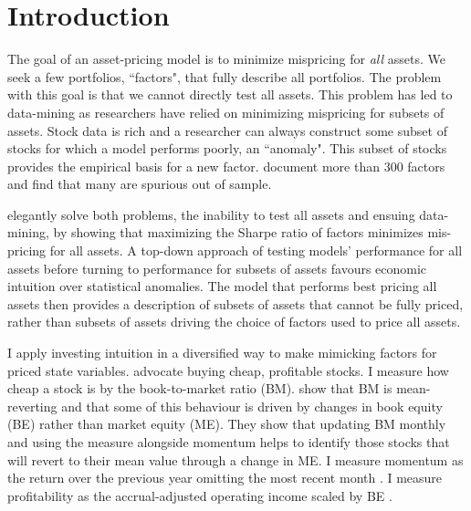 
\section*{Introduction}

The goal of an asset-pricing model is to minimize mispricing for
\emph{all} assets.
We seek a few portfolios, ``factors", that fully describe all portfolios.
The problem with this goal is that we cannot directly test all assets.
This problem has led to data-mining as researchers have relied on minimizing
mispricing for subsets of assets.
Stock data is rich and a researcher can always construct some subset of stocks
for which a model performs poorly, an ``anomaly".
This subset of stocks provides the empirical basis for a new factor.
\textcite{harvey2016and} document more than 300 factors and
\textcite{linnainmaa2016history} find that many are spurious out of sample.

\textcite{barillas2016alpha} elegantly solve both problems,
the inability to test all assets and ensuing data-mining,
by showing that maximizing the Sharpe ratio of factors minimizes
mis-pricing for all assets.
A top-down approach of testing models' performance for all assets before
turning to performance for subsets of assets favours economic intuition over
statistical anomalies.
The model that performs best pricing all assets then provides a description
of subsets of assets that cannot be fully priced,
rather than subsets of assets driving the choice of factors used to price all
assets.

I apply investing intuition in a diversified way to make mimicking factors for
priced state variables.
\textcite{graham1934security} advocate buying cheap, profitable stocks.
I measure how cheap a stock is by the book-to-market ratio (BM).
\textcite{kok2017facts} show that BM is mean-reverting and that some of this
behaviour is driven by changes in book equity (BE) rather than market equity
(ME).
They show that updating BM monthly and using the measure alongside momentum
helps to identify those stocks that will revert to their mean value through a
change in ME.
I measure momentum as the return over the previous year omitting the most
recent month \parencite{fama2016dissecting}.
I measure profitability as the accrual-adjusted operating income scaled by BE
\parencite{ball2016accruals}.

